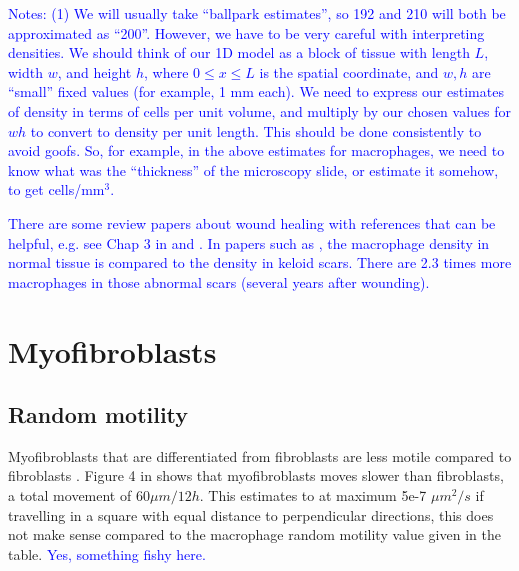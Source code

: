\documentclass{article}
\newcommand{\LEK}[1]{\textcolor{blue}{#1}}
\begin{document}
        \LEK{Notes: (1) We will usually take ``ballpark estimates'', so 192 and 210 will both be approximated as ``200''. However, we have to be very careful with interpreting densities. We should think of our 1D model as a block of tissue with length $L$, width $w$, and height $h$, where $0\le x \le L$ is the spatial coordinate, and $w,h$ are ``small'' fixed values (for example, 1 mm each). We need to express our estimates of density in terms of cells per unit volume, and multiply by our chosen values for $wh$ to convert to density per unit length. This should be done consistently to avoid goofs. So, for example, in the above estimates for macrophages, we need to know what was the ``thickness'' of the microscopy slide, or estimate it somehow, to get cells/mm$^3$.}

        \LEK{There are some review papers about wound healing with references that can be helpful, e.g. see Chap 3 in \cite{teot2020textbook} and \cite{rodrigues2019wound}. In papers such as \cite{boyce2001inflammatory}, the macrophage density in normal tissue is compared to the density in keloid scars. There are 2.3 times more macrophages in those abnormal scars (several years after wounding).}

\section*{Myofibroblasts}
    \subsection{Random motility}
        Myofibroblasts that are differentiated from fibroblasts are less motile compared to fibroblasts \cite{thampatty2007new}. Figure 4 in \cite{thampatty2007new} shows that myofibroblasts moves slower than fibroblasts, a total movement of $ 60\mu m/12 h$. This estimates to at maximum 5e-7 $\mu m^2/s$ if travelling in a square with equal distance to perpendicular directions, this does not make sense compared to the macrophage random motility value given in the table. \LEK{Yes, something fishy here.}
\end{document}
